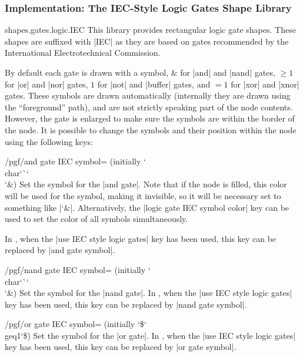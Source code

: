 \subsubsection{Implementation: The IEC-Style Logic Gates Shape Library}

\begin{pgflibrary}{shapes.gates.logic.IEC}
    This library provides rectangular logic gate shapes. These shapes are
    suffixed with |IEC| as they are based on gates recommended by the
    International Electrotechnical Commission.

    By default each gate is drawn with a symbol, $\texttt{\&}$ for |and| and
    |nand| gates, $\geq1$ for |or| and |nor| gates, $1$ for |not| and |buffer|
    gates, and $=1$ for |xor| and |xnor| gates. These symbols are drawn
    automatically (internally they are drawn using the ``foreground'' path),
    and are not strictly speaking part of the node contents. However, the gate
    is enlarged to make sure the symbols are within the border of the node. It
    is possible to change the symbols and their position within the node using
    the following keys:

    \begin{key}{/pgf/and gate IEC symbol= (initially \char`\\char\char`\`\char`\\\char`\&)}
        Set the symbol for the |and gate|. Note that if the node is filled,
        this color will be used for the symbol, making it invisible, so it will
        be necessary set  to something like |\color{black}\char`\&|.
        Alternatively, the |logic gate IEC symbol color| key can be used to set
        the color of all symbols simultaneously.

        In \tikzname, when the |use IEC style logic gates| key has been used,
        this key can be replaced by |and gate symbol|.
    \end{key}

    \begin{key}{/pgf/nand gate IEC symbol= (initially \char`\\char\char`\`\char`\\\char`\&)}
        Set the symbol for the |nand gate|. In \tikzname, when the
        |use IEC style logic gates| key has been used, this key can be replaced
        by |nand gate symbol|.
    \end{key}

    \begin{key}{/pgf/or gate IEC symbol= (initially \char`\$\char`\\geq1\char`\$)}
        Set the symbol for the |or gate|. In \tikzname, when the
        |use IEC style logic gates| key has been used, this key can be replaced
        by |or gate symbol|.
    \end{key}


\end{pgflibrary}
